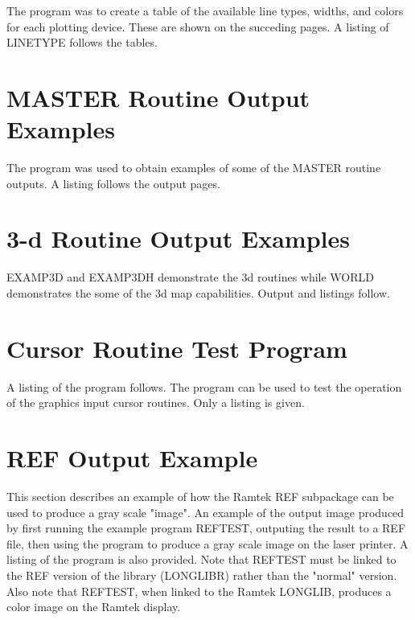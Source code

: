 \documentclass[11pt]{report}
\begin{document}
The program  was to create a table of the available line types,
widths, and colors for each plotting device. These are shown on the
succeding pages.  A listing of LINETYPE follows the tables.

\newpage
\section{MASTER Routine Output Examples}

The program  was used to obtain examples of some of the MASTER
routine outputs.  A listing follows the output pages.

\newpage
\section{3-d Routine Output Examples}

EXAMP3D and EXAMP3DH demonstrate the 3d routines while WORLD demonstrates
the some of the 3d map capabilities.  Output and listings follow.

\newpage
\section{Cursor Routine Test Program}

A listing of the program  follows.  The program can be used
to test the operation of the graphics input cursor routines.  Only a listing
is given.

\newpage
\section{REF Output Example}

This section describes an example of how the Ramtek REF subpackage can
be used to produce a gray scale "image".  An example of the output
image produced by first running the example program REFTEST, outputing
the result to a REF file, then using the program  to produce
a gray scale image on the  laser printer.  A listing of
the  program is also provided.  Note that REFTEST must be
linked to the REF version of the library (LONGLIBR) rather than the
"normal" version.  Also note that REFTEST, when linked to the Ramtek
LONGLIB, produces a color image on the Ramtek display.

\newpage
\printindex
\end{document}
